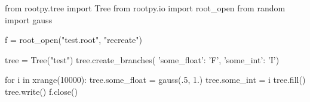 \begin{footnotesize}
\begin{pyglist}[language=python,texcl=true,abovecaptionskip=0,style=vs,bgcolor=Moccasin]
from rootpy.tree import Tree
from rootpy.io import root_open
from random import gauss

f = root_open("test.root", "recreate")

tree = Tree("test")
tree.create_branches(
        {'some_float': 'F',
         'some_int': 'I'})

for i in xrange(10000):
    tree.some_float = gauss(.5, 1.)
    tree.some_int = i
    tree.fill()
tree.write()
f.close()
\end{pyglist}
\end{footnotesize}
